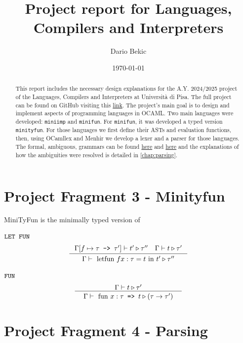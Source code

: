 \documentclass[a4paper,11pt]{report}
\title{Project report for Languages, Compilers and Interpreters}
\author{Dario Bekic}
\date{\today}
\begin{document}
\maketitle
\tableofcontents

\begin{abstract}
This report includes the necessary design explanations for the A.Y. 2024/2025 project of the Languages, Compilers and Interpreters at Università di Pisa.
The full project can be found on GitHub visiting this \href{https://github.com/wuacs/unipi-lci/tree/main/project}{link}.
The project's main goal is to design and implement aspects of programming languages in OCAML. Two main languages were developed: \verb|miniimp| and \verb|minifun|. For \verb|minifun|, it was developed a typed version \verb|minityfun|. For those languages we first define their ASTs and evaluation functions, then, using OCamllex and Menhir we develop a lexer and a parser for those languages. The formal, ambiguous, grammars can be found \href{https://lceragioli.github.io/pages/Slides/semantics.pdf}{here} and \href{https://lceragioli.github.io/pages/Slides/types.pdf}{here} and the explanations of how the ambiguities were resolved is detailed in \autoref{chap:parsing}.
\end{abstract}

\section{Project Fragment 3 - Minityfun}

MiniTyFun is the minimally typed version of


$\verb|LET FUN|$
\\
\[
\inference[]
{ 
\Gamma[f \mapsto \tau \texttt{ -> } \tau'] \vdash t' \triangleright \tau''\quad
\Gamma \vdash t \triangleright \tau'
}
{
\begin{array}{c}
\Gamma \vdash  \text{ letfun } f x:\tau = t \text{ in } t' \triangleright \tau''
\end{array}
}
\]

$\verb|FUN|$
\\
\[
\inference[]
{ 
\Gamma \vdash t \triangleright \tau'
}
{
\begin{array}{c}
\Gamma \vdash  \text{ fun } x:\tau \texttt{ => } t \triangleright (\tau \rightarrow \tau')
\end{array}
}
\]

\section{Project Fragment 4 - Parsing}\label{chap:parsing}
\end{document}
